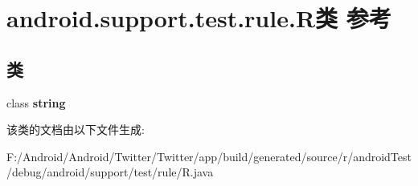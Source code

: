 \hypertarget{classandroid_1_1support_1_1test_1_1rule_1_1_r}{}\section{android.\+support.\+test.\+rule.\+R类 参考}
\label{classandroid_1_1support_1_1test_1_1rule_1_1_r}
\subsection*{类}
\begin{DoxyCompactItemize}
\item 
class {\bfseries string}
\end{DoxyCompactItemize}


该类的文档由以下文件生成\+:\begin{DoxyCompactItemize}
\item 
F\+:/\+Android/\+Android/\+Twitter/\+Twitter/app/build/generated/source/r/android\+Test/debug/android/support/test/rule/R.\+java\end{DoxyCompactItemize}
